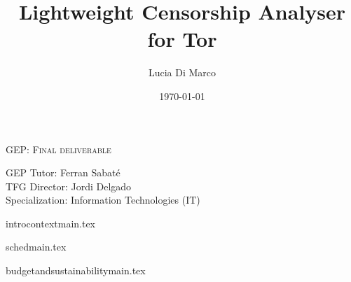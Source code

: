 \documentclass[a4paper,10pt]{article}
\begin{document}

{\parskip=0pt
\title{\vspace{30mm}\textbf{\Large Lightweight Censorship Analyser for Tor}} 
\author{Lucia Di Marco}
\date{\small{\today}}
\maketitle

\vspace{5mm}
\begin{center}
\centering
\textsc{GEP: Final deliverable}
\vspace{5mm}

\textnormal{\small{GEP Tutor: Ferran Sabaté 
 \\ TFG Director: Jordi Delgado 
 \\ Specialization: Information Technologies (IT)}}
\end{center}
}
\newpage
{} 
\tableofcontents
\newpage

{introcontextmain.tex}

\pagebreak
{schedmain.tex}

\pagebreak
{budgetandsustainabilitymain.tex}

\cleardoublepage


\end{document}
